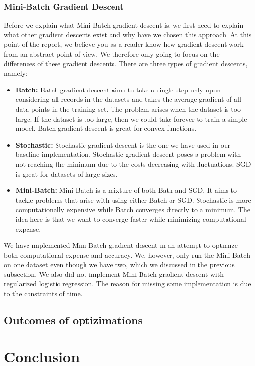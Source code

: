 \subsubsection{Mini-Batch Gradient Descent}
Before we explain what Mini-Batch gradient descent is, we first need to explain what other gradient descents exist and why have we chosen this approach. At this point of the report, we believe you as a reader know how gradient descent work from an abstract point of view. We therefore only going to focus on the differences of these gradient descents. There are three types of gradient descents, namely:
\begin{itemize}
    \item \textbf{Batch: }Batch gradient descent aims to take a single step only upon considering all records in the datasets and takes the average gradient of all data points in the training set. The problem arises when the dataset is too large. If the dataset is too large, then we could take forever to train a simple model. Batch gradient descent is great for convex functions.
    \item \textbf{Stochastic: }Stochastic gradient descent is the one we have used in our baseline implementation. Stochastic gradient descent poses a problem with not reaching the minimum due to the costs decreasing with fluctuations. SGD is great for datasets of large sizes.
    \item \textbf{Mini-Batch: }Mini-Batch is a mixture of both Bath and SGD. It aims to tackle problems that arise with using either Batch or SGD. Stochastic is more computationally expensive while Batch converges directly to a minimum. The idea here is that we want to converge faster while minimizing computational expense.
\end{itemize}

We have implemented Mini-Batch gradient descent in an attempt to optimize both computational expense and accuracy. We, however, only run the Mini-Batch on one dataset even though we have two, which we discussed in the previous subsection. We also did not implement Mini-Batch gradient descent with regularized logistic regression.  The reason for missing some implementation is due to the constraints of time.

\subsection{Outcomes of optizimations}

\newpage
\section{Conclusion}

